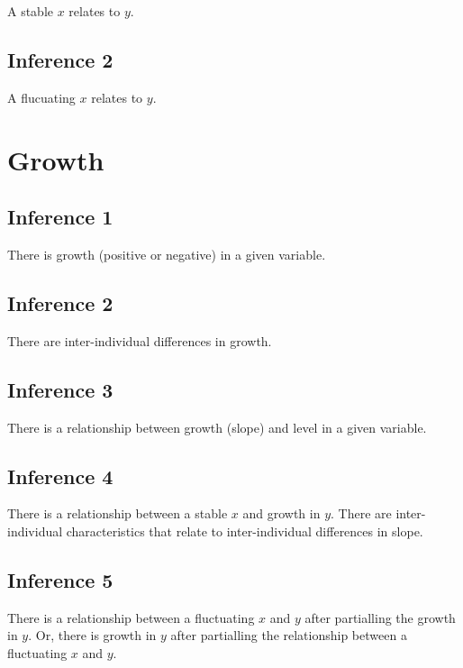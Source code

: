 \documentclass[english,,man]{apa6}
\theoremstyle{definition}
\theoremstyle{definition}
\theoremstyle{definition}
\theoremstyle{remark}
\begin{document}
A stable \(x\) relates to \(y\).

\hypertarget{inference-2-3}{%
\subsection{Inference 2}\label{inference-2-3}}

A flucuating \(x\) relates to \(y\).

\hypertarget{growth-1}{%
\section{Growth}\label{growth-1}}

\hypertarget{inference-1-6}{%
\subsection{Inference 1}\label{inference-1-6}}

There is growth (positive or negative) in a given variable.

\hypertarget{inference-2-4}{%
\subsection{Inference 2}\label{inference-2-4}}

There are inter-individual differences in growth.

\hypertarget{inference-3-2}{%
\subsection{Inference 3}\label{inference-3-2}}

There is a relationship between growth (slope) and level in a given
variable.

\hypertarget{inference-4-1}{%
\subsection{Inference 4}\label{inference-4-1}}

There is a relationship between a stable \(x\) and growth in \(y\).
There are inter-individual characteristics that relate to
inter-individual differences in slope.

\hypertarget{inference-5-1}{%
\subsection{Inference 5}\label{inference-5-1}}

There is a relationship between a fluctuating \(x\) and \(y\) after
partialling the growth in \(y\). Or, there is growth in \(y\) after
partialling the relationship between a fluctuating \(x\) and \(y\).
\end{document}
